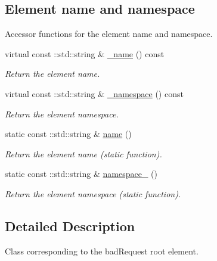 \subsection*{Element name and namespace}
\label{_amgrpd4b5b61f6e07390f4af2465e04571f34}
Accessor functions for the element name and namespace. \begin{DoxyCompactItemize}
\item 
virtual const ::std::string \& \hyperlink{classopenstack_1_1xml_1_1BadRequest_a510b8c89d07fbc08b4e93447cb675698}{\_\-name} () const 
\begin{DoxyCompactList}\small\item\em Return the element name. \item\end{DoxyCompactList}\item 
virtual const ::std::string \& \hyperlink{classopenstack_1_1xml_1_1BadRequest_a0eeba478f6077cad9ae6fdc3676bb1c1}{\_\-namespace} () const 
\begin{DoxyCompactList}\small\item\em Return the element namespace. \item\end{DoxyCompactList}\item 
static const ::std::string \& \hyperlink{classopenstack_1_1xml_1_1BadRequest_afbc51b00aa0fe67deca45797d629a53e}{name} ()
\begin{DoxyCompactList}\small\item\em Return the element name (static function). \item\end{DoxyCompactList}\item 
static const ::std::string \& \hyperlink{classopenstack_1_1xml_1_1BadRequest_ad4c92ba0982044a0250708c99e821b18}{namespace\_\-} ()
\begin{DoxyCompactList}\small\item\em Return the element namespace (static function). \item\end{DoxyCompactList}\end{DoxyCompactItemize}


\subsection{Detailed Description}
Class corresponding to the badRequest root element. 

